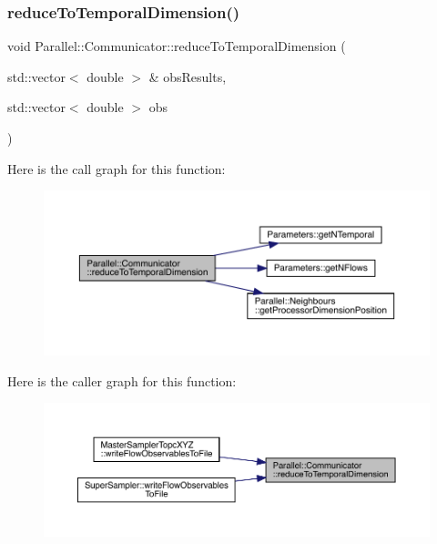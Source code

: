 \subsubsection{\texorpdfstring{reduceToTemporalDimension()}{reduceToTemporalDimension()}}
{\footnotesize\ttfamily void Parallel\+::\+Communicator\+::reduce\+To\+Temporal\+Dimension (\begin{DoxyParamCaption}\item[{std\+::vector$<$ double $>$ \&}]{obs\+Results,  }\item[{std\+::vector$<$ double $>$}]{obs }\end{DoxyParamCaption})\hspace{0.3cm}{\ttfamily [static]}}

Here is the call graph for this function\+:\nopagebreak
\begin{figure}[H]
\begin{center}
\leavevmode
\includegraphics[width=350pt]{class_parallel_1_1_communicator_a3da13427d693e0ce924159e871c83e19_cgraph}
\end{center}
\end{figure}
Here is the caller graph for this function\+:\nopagebreak
\begin{figure}[H]
\begin{center}
\leavevmode
\includegraphics[width=350pt]{class_parallel_1_1_communicator_a3da13427d693e0ce924159e871c83e19_icgraph}
\end{center}
\end{figure}
\mbox{\label{class_parallel_1_1_communicator_ad48e48ab0137dab329d31fc1e3ebf179}} 
